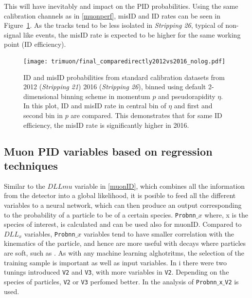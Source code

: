 This will have inevitably and impact on the \gls{PID} probabilities. Using the same calibration channels as in \autoref{muonperf}, misID and ID rates can be seen in Figure~\ref{fig:nSharedRun1andRun2}. As the tracks tend to be less isolated in \textit{Stripping 26}, typical of non-signal like events, the misID rate is expected to be higher for the same working point (ID efficiency).

\begin{figure}[h!]
\centering
\texttt{[image: trimuon/final\_comparedirectly2012vs2016\_nolog.pdf]}
	\caption{ID and misID probabilities from standard calibration datasets from 2012 (\textit{Stripping 21}) 2016 (\textit{Stripping 26}), binned using default 2-dimensional binning scheme in momentum $p$ and pseudorapidity $\eta$. In this plot, ID and misID rate in central bin of $\eta$ and first and second bin in $p$ are compared. This demonstrates that for same ID efficiency, the misID rate is significantly higher in 2016.}
\label{fig:nSharedRun1andRun2}
\end{figure}

\subsection{Muon PID variables based on regression techniques}
Similar to the $DLLmu$ variable in \autoref{muonID}, which combines all the information from the detector into a global likelihood, it is posible to feed all the different variables to a neural network, which can then produce an output 
corresponding to the probability of a particle to be of a certain species. \texttt{Probnn$\_{x}$} where, x is the species of interest, is calculated and can be used also for muonID. Compared to $DLL_{x}$ variables, \texttt{Probnn$\_{x}$} variables tend to have smaller correlation with the kinematics of the particle, and hence are more useful with decays where particles are soft, such as \Bmumumu. As with any machine learning alghotritms, the selection of the training sample is important as well as input variables. In \Rn{1} there were two tunings introduced \texttt{V2} and \texttt{V3}, with more variables in \texttt{V2}. Depending on the species of particles, \texttt{V2} or \texttt{V3} perfomed better. In the analysis of \Bmumumu \texttt{Probnn$\_${x}$\_$V2} is used.


